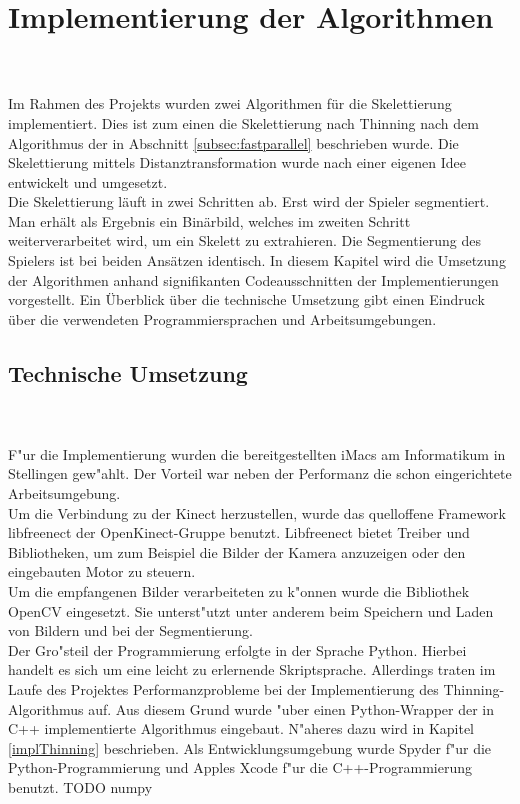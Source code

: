 \chapter{Implementierung der Algorithmen}
\label{ch:implementierung}
\\\\
Im Rahmen des Projekts wurden zwei Algorithmen für die Skelettierung implementiert. Dies ist zum einen
die Skelettierung nach Thinning nach dem Algorithmus der in Abschnitt \ref{subsec:fastparallel} beschrieben wurde. Die Skelettierung mittels Distanztransformation wurde nach einer eigenen Idee entwickelt und
umgesetzt.\\
Die Skelettierung läuft in zwei Schritten ab. Erst wird der Spieler segmentiert. Man erhält als
Ergebnis ein Binärbild, welches im zweiten Schritt weiterverarbeitet wird, um ein Skelett zu extrahieren. 
Die Segmentierung des Spielers ist bei beiden Ansätzen identisch.
In diesem Kapitel wird die Umsetzung der Algorithmen anhand signifikanten Codeausschnitten der Implementierungen vorgestellt. Ein Überblick über die technische Umsetzung gibt einen Eindruck über die
verwendeten Programmiersprachen und Arbeitsumgebungen.
\section{Technische Umsetzung}
\label{sec:technische_umsetzung}
\\\\
F"ur die Implementierung wurden die bereitgestellten iMacs am Informatikum in Stellingen gew"ahlt. Der Vorteil war neben der Performanz die schon eingerichtete Arbeitsumgebung.\\
Um die Verbindung zu der Kinect herzustellen, wurde das quelloffene Framework libfreenect  der OpenKinect-Gruppe benutzt. Libfreenect bietet Treiber und Bibliotheken, um zum Beispiel die Bilder der Kamera anzuzeigen oder den eingebauten Motor zu steuern. \\
Um die empfangenen Bilder verarbeiteten zu k"onnen wurde die Bibliothek OpenCV eingesetzt. Sie unterst"utzt unter anderem beim Speichern und Laden von Bildern und bei der Segmentierung. \\
Der Gro"steil der Programmierung erfolgte in der Sprache Python. Hierbei handelt es sich um eine leicht zu erlernende Skriptsprache. Allerdings traten im Laufe des Projektes Performanzprobleme bei der Implementierung des Thinning-Algorithmus auf. Aus diesem Grund wurde "uber einen Python-Wrapper der in C++ implementierte Algorithmus eingebaut. N"aheres dazu wird in Kapitel \ref{implThinning} beschrieben.
Als Entwicklungsumgebung wurde Spyder f"ur die Python-Programmierung und Apples Xcode f"ur die C++-Programmierung benutzt.
TODO numpy

